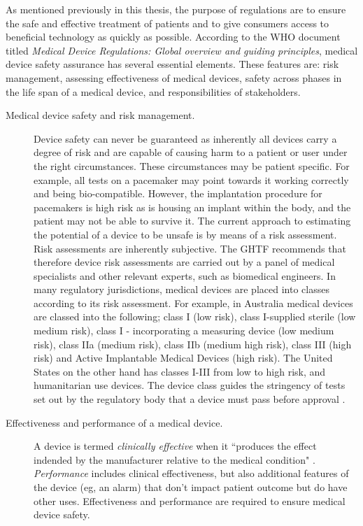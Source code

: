 \documentclass[12pt, openany, oneside]{book}
\begin{document}
As mentioned previously in this thesis, the purpose of regulations are to ensure the safe and effective treatment of patients and to give consumers access to beneficial technology as quickly as possible. According to the WHO document titled \textit{Medical Device Regulations: Global overview and guiding principles}, medical device safety assurance has several essential elements. These features are: risk management, assessing effectiveness of medical devices, safety across phases in the life span of a medical device, and responsibilities of stakeholders.  

\begin{description}
	\item[Medical device safety and risk management.] Device safety can never be guaranteed as inherently all devices carry a degree of risk and are capable of causing harm to a patient or user under the right circumstances. These circumstances may be patient specific. For example, all tests on a pacemaker may point towards it working correctly and being bio-compatible. However, the implantation procedure for pacemakers is high risk as is housing an implant within the body, and the patient may not be able to survive it. The current approach to estimating the potential of a device to be unsafe is by means of a risk assessment. Risk assessments are inherently subjective. The GHTF recommends that therefore device risk assessments are carried out by a panel of medical specialists and other relevant experts, such as biomedical engineers. In many regulatory jurisdictions, medical devices are placed into classes according to its risk assessment. For example, in Australia medical devices are classed into the following; class I (low risk), class I-supplied sterile (low medium risk), class I - incorporating a measuring device (low medium risk), class IIa (medium risk), class IIb (medium high risk), class III (high risk) and Active Implantable Medical Devices (high risk). The United States on the other hand has classes I-III from low to high risk, and humanitarian use devices. The device class guides the stringency of tests set out by the regulatory body that a device must pass before approval \citep{cheng2003, gupta2016medical}.
	\item[Effectiveness and performance of a medical device.]  A device is termed \textit{clinically effective} when it ``produces the effect indended by the manufacturer relative to the medical condition" \citep{cheng2003}. \textit{Performance} includes clinical effectiveness, but also additional features of the device (eg, an alarm) that don't impact patient outcome but do have other uses. Effectiveness and performance are required to ensure medical device safety.

\end{description}
\end{document}
